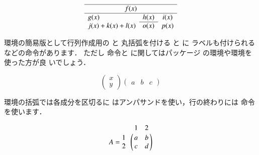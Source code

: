 \begin{InOut}
\begin{displaymath}
\begin{array}{llc} \hline
\multicolumn{3}{c}{f(x)} \\ \hline
g(x) & h(x) & i(x) \\ \cline{2-2}
j(x)+k(x)+l(x) & o(x) & p(x)\\
\end{array}
\end{displaymath} 
\end{InOut}



環境の簡易版として行列作成用の と
丸括弧を付ける と に
ラベルも付けられる などの命令があります．
ただし 命令と に関してはパッケージ
の環境や環境を使った方が良
いでしょう．
\begin{InOut}
\[ \begin{pmatrix} x \\ y 
   \end{pmatrix} \begin{pmatrix}
      a & b & c \end{pmatrix} \]
\end{InOut}

環境の括弧では各成分を区切るに
はアンパサンド\qu{\str\&}を使い，行の終わりには
命令を使います．
\begin{InOut}
\[ A=\ \bordermatrix{
     & 1 & 2 \cr
  1  & a & b \cr
  2  & c & d }     \] 
\end{InOut}


